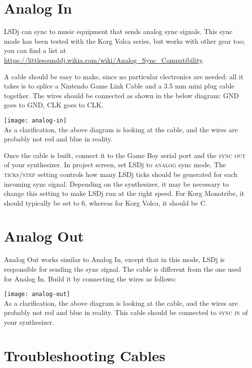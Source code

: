 \section{Analog In}

LSDj can sync to music equipment that sends analog sync signals. This sync mode has been tested with the Korg Volca series, but works with other gear too; you can find a list at \url{https://littlesounddj.wikia.com/wiki/Analog_Sync_Compatibility}.

A cable should be easy to make, since no particular electronics are needed: all it takes is to splice a Nintendo Game Link Cable and a 3.5 mm mini plug cable together. The wires should be connected as shown in the below diagram: GND goes to GND, CLK goes to CLK.

\texttt{[image: analog-in]}\\

As a clarification, the above diagram is looking at the cable, and the wires are probably not red and blue in reality.

Once the cable is built, connect it to the Game Boy serial port and the \textsc{sync out} of your synthesizer. In project screen, set LSDj to \textsc{analog} sync mode. The \textsc{ticks/step} setting controls how many LSDj ticks should be generated for each incoming sync signal. Depending on the synthesizer, it may be necessary to change this setting to make LSDj run at the right speed. For Korg Monotribe, it should typically be set to 6, whereas for Korg Volca, it should be C.

\section{Analog Out}

Analog Out works similar to Analog In, except that in this mode, LSDj is responsible for sending the sync signal. The cable is different from the one used for Analog In. Build it by connecting the wires as follows:

\texttt{[image: analog-out]}\\

As a clarification, the above diagram is looking at the cable, and the wires are probably not red and blue in reality. This cable should be connected to \textsc{sync in} of your synthesizer.

\section{Troubleshooting Cables}

